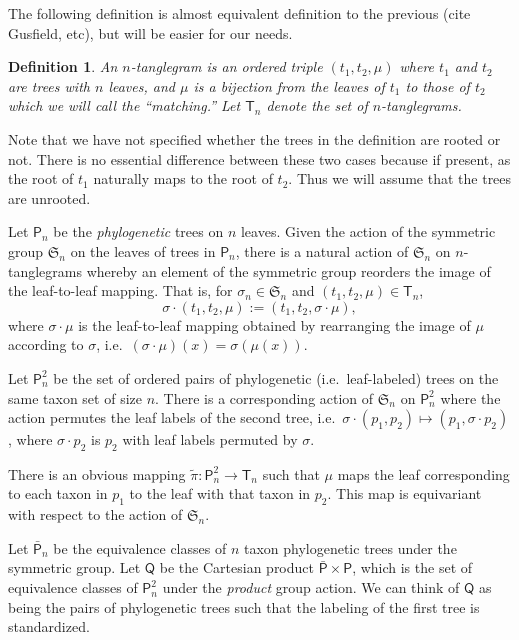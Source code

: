 \documentclass{amsart}
\newtheorem{definition}[theorem]{Definition}
\newcommand{\fS}{\mathfrak S}
\newcommand{\match}{\mu}
\newcommand{\tangle}{\mathsf{T}}
\newcommand{\ptree}{\mathsf{P}}
\newcommand{\ptpair}{\ptree^2}
\newcommand{\ptequiv}{\bar{\ptree}}  %
\newcommand{\stpair}{\mathsf{Q}}  %
\newcommand{\bigproj}{\tilde \pi}
\begin{document}
The following definition is almost equivalent definition to the previous (cite Gusfield, etc), but will be easier for our needs.
\begin{definition}
An $n$-\textit{tanglegram} is an ordered triple $(t_1, t_2, \match)$ where $t_1$ and $t_2$ are trees with $n$ leaves, and $\match$ is a bijection from the leaves of $t_1$ to those of $t_2$ which we will call the ``matching.''
Let $\tangle_n$ denote the set of $n$-tanglegrams.
\end{definition}
Note that we have not specified whether the trees in the definition are rooted or not.
There is no essential difference between these two cases because if present, as the root of $t_1$ naturally maps to the root of $t_2$.
Thus we will assume that the trees are unrooted.

Let $\ptree_n$ be the \emph{phylogenetic} trees on $n$ leaves.
Given the action of the symmetric group $\fS_n$ on the leaves of trees in $\ptree_n$, there is a natural action of $\fS_n$ on $n$-tanglegrams whereby an element of the symmetric group reorders the image of the leaf-to-leaf mapping.
That is, for $\sigma_n \in \fS_n$ and $(t_1, t_2, \match) \in \tangle_n$,
\[
\sigma \cdot (t_1, t_2, \match) := (t_1, t_2, \sigma \cdot \match),
\]
where $\sigma \cdot \match$ is the leaf-to-leaf mapping obtained by rearranging the image of $\match$ according to $\sigma$, i.e.\ $(\sigma \cdot \match)(x) = \sigma(\match(x))$.

Let $\ptpair_n$ be the set of ordered pairs of phylogenetic (i.e.\ leaf-labeled) trees on the same taxon set of size $n$.
There is a corresponding action of $\fS_n$ on $\ptpair_n$ where the action permutes the leaf labels of the second tree, i.e.\ $\sigma \cdot (p_1, p_2) \mapsto (p_1, \sigma \cdot p_2)$, where $\sigma \cdot p_2$ is $p_2$ with leaf labels permuted by $\sigma$.

There is an obvious mapping $\bigproj: \ptpair_n \rightarrow \tangle_n$ such that $\match$ maps the leaf corresponding to each taxon in $p_1$ to the leaf with that taxon in $p_2$.
This map is equivariant with respect to the action of $\fS_n$.

Let $\ptequiv_n$ be the equivalence classes of $n$ taxon phylogenetic trees under the symmetric group.
Let $\stpair$ be the Cartesian product $\ptequiv \times \ptree$, which is the set of equivalence classes of $\ptpair_n$ under the \emph{product} group action.
We can think of $\stpair$ as being the pairs of phylogenetic trees such that the labeling of the first tree is standardized.
\end{document}
